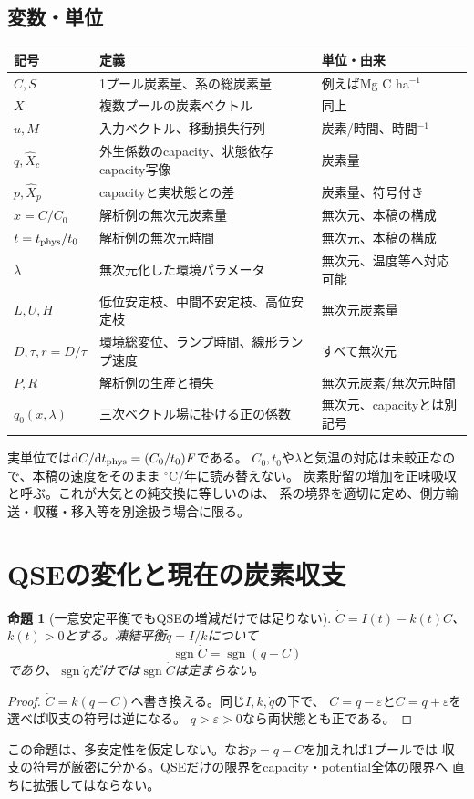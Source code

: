 \documentclass[a4paper,11pt]{ltjsarticle}
\newtheorem{proposition}{命題}
\newcommand{\dd}{\mathrm d}
\begin{document}
\subsection{変数・単位}
\begin{longtable}{p{26mm}p{79mm}p{34mm}}
\toprule 記号&定義&単位・由来\\\midrule\endhead
$C,S$&1プール炭素量、系の総炭素量&例えばMg C ha$^{-1}$\\
$X$&複数プールの炭素ベクトル&同上\\
$u,M$&入力ベクトル、移動損失行列&炭素/時間、時間$^{-1}$\\
$q,\widehat X_c$&外生係数のcapacity、状態依存capacity写像&炭素量\\
$p,\widehat X_p$&capacityと実状態との差&炭素量、符号付き\\
$x=C/C_0$&解析例の無次元炭素量&無次元、本稿の構成\\
$t=t_{\rm phys}/t_0$&解析例の無次元時間&無次元、本稿の構成\\
$\lambda$&無次元化した環境パラメータ&無次元、温度等へ対応可能\\
$L,U,H$&低位安定枝、中間不安定枝、高位安定枝&無次元炭素量\\
$D,\tau,r=D/\tau$&環境総変位、ランプ時間、線形ランプ速度&すべて無次元\\
$P,R$&解析例の生産と損失&無次元炭素/無次元時間\\
$q_0(x,\lambda)$&三次ベクトル場に掛ける正の係数&無次元、capacityとは別記号\\
\bottomrule
\end{longtable}
実単位では$\dd C/\dd t_{\rm phys}=(C_0/t_0)F$である。
$C_0,t_0$や$\lambda$と気温の対応は未較正なので、本稿の速度をそのまま
$^\circ$C/年に読み替えない。
炭素貯留の増加を正味吸収と呼ぶ。これが大気との純交換に等しいのは、
系の境界を適切に定め、側方輸送・収穫・移入等を別途扱う場合に限る。

\section{QSEの変化と現在の炭素収支}
\begin{proposition}[一意安定平衡でもQSEの増減だけでは足りない]
$\dot C=I(t)-k(t)C$、$k(t)>0$とする。凍結平衡$q=I/k$について
\[
\operatorname{sgn}\dot C=\operatorname{sgn}(q-C)
\]
であり、$\operatorname{sgn}\dot q$だけでは$\operatorname{sgn}\dot C$は定まらない。
\end{proposition}
\begin{proof}
$\dot C=k(q-C)$へ書き換える。同じ$I,k,\dot q$の下で、
$C=q-\varepsilon$と$C=q+\varepsilon$を選べば収支の符号は逆になる。
$q>\varepsilon>0$なら両状態とも正である。
\end{proof}
この命題は、多安定性を仮定しない。なお$p=q-C$を加えれば1プールでは
収支の符号が厳密に分かる。QSEだけの限界をcapacity・potential全体の限界へ
直ちに拡張してはならない。
\end{document}
